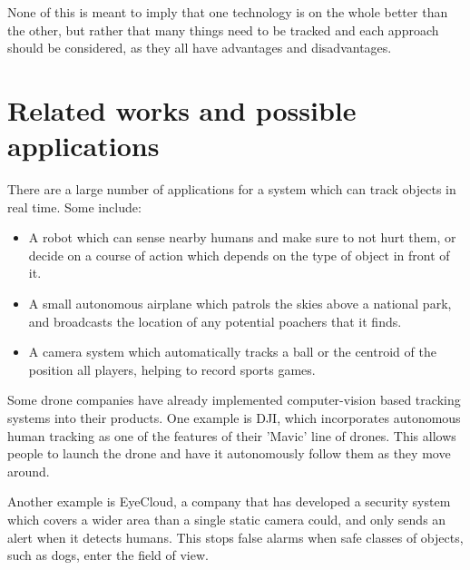 None of this is meant to imply that one technology is on the whole better than the other, but rather that many things need to be tracked and each approach should be considered, as they all have advantages and disadvantages.


\section{Related works and possible applications}
There are a large number of applications for a system which can track objects in real time. Some include:

\begin{itemize}
\item A robot which can sense nearby humans and make sure to not hurt them, or decide on a course of action which depends on the type of object in front of it.
\item A small autonomous airplane which patrols the skies above a national park, and broadcasts the location of any potential poachers that it finds.
\item A camera system which automatically tracks a ball or the centroid of the position all players, helping to record sports games.
\end{itemize}

Some drone companies have already implemented computer-vision based tracking systems into their products. One example is DJI, which incorporates autonomous human tracking as one of the features of their 'Mavic' line of drones. This allows people to launch the drone and have it autonomously follow them as they move around.

Another example is EyeCloud, a company that has developed a security system which covers a wider area than a single static camera could, and only sends an alert when it detects humans. This stops false alarms when safe classes of objects, such as dogs, enter the field of view.
